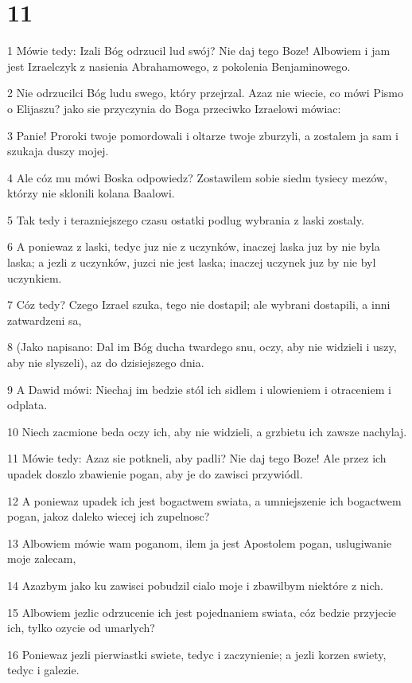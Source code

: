 \chapter{11}

\par 1 Mówie tedy: Izali Bóg odrzucil lud swój? Nie daj tego Boze! Albowiem i jam jest Izraelczyk z nasienia Abrahamowego, z pokolenia Benjaminowego.
\par 2 Nie odrzucilci Bóg ludu swego, który przejrzal. Azaz nie wiecie, co mówi Pismo o Elijaszu? jako sie przyczynia do Boga przeciwko Izraelowi mówiac:
\par 3 Panie! Proroki twoje pomordowali i oltarze twoje zburzyli, a zostalem ja sam i szukaja duszy mojej.
\par 4 Ale cóz mu mówi Boska odpowiedz? Zostawilem sobie siedm tysiecy mezów, którzy nie sklonili kolana Baalowi.
\par 5 Tak tedy i terazniejszego czasu ostatki podlug wybrania z laski zostaly.
\par 6 A poniewaz z laski, tedyc juz nie z uczynków, inaczej laska juz by nie byla laska; a jezli z uczynków, juzci nie jest laska; inaczej uczynek juz by nie byl uczynkiem.
\par 7 Cóz tedy? Czego Izrael szuka, tego nie dostapil; ale wybrani dostapili, a inni zatwardzeni sa,
\par 8 (Jako napisano: Dal im Bóg ducha twardego snu, oczy, aby nie widzieli i uszy, aby nie slyszeli), az do dzisiejszego dnia.
\par 9 A Dawid mówi: Niechaj im bedzie stól ich sidlem i ulowieniem i otraceniem i odplata.
\par 10 Niech zacmione beda oczy ich, aby nie widzieli, a grzbietu ich zawsze nachylaj.
\par 11 Mówie tedy: Azaz sie potkneli, aby padli? Nie daj tego Boze! Ale przez ich upadek doszlo zbawienie pogan, aby je do zawisci przywiódl.
\par 12 A poniewaz upadek ich jest bogactwem swiata, a umniejszenie ich bogactwem pogan, jakoz daleko wiecej ich zupelnosc?
\par 13 Albowiem mówie wam poganom, ilem ja jest Apostolem pogan, uslugiwanie moje zalecam,
\par 14 Azazbym jako ku zawisci pobudzil cialo moje i zbawilbym niektóre z nich.
\par 15 Albowiem jezlic odrzucenie ich jest pojednaniem swiata, cóz bedzie przyjecie ich, tylko ozycie od umarlych?
\par 16 Poniewaz jezli pierwiastki swiete, tedyc i zaczynienie; a jezli korzen swiety, tedyc i galezie.
